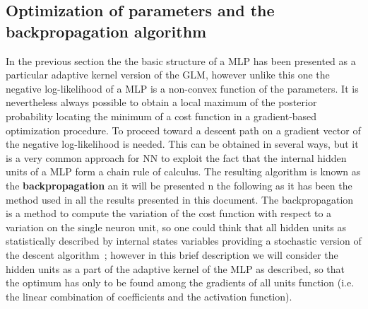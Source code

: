 

\subsection{Optimization of parameters and the backpropagation algorithm}

In the previous section the the basic structure of a \acl{MLP} has been presented as a particular adaptive kernel version of the \acl{GLM}, however unlike this one the negative log-likelihood of a \acl{MLP} is a non-convex function of the parameters. It is nevertheless always possible to obtain a local maximum of the posterior probability locating the minimum of a cost function in a gradient-based optimization procedure. 
To proceed toward a descent path on a gradient vector of the negative log-likelihood is needed. This can be obtained in several ways, but it is a very common approach for NN to exploit the fact that the internal hidden units of a \acl{MLP} form a chain rule of calculus. The resulting algorithm is known as the \textbf{backpropagation} an it will be presented n the following as it has been the method used in all the results presented in this document. The backpropagation is a method to compute the variation of the cost function with respect to a variation on the single neuron unit, so one could think that all hidden units as statistically described by internal states variables providing a stochastic version of the descent algorithm~\cite{rezende2014stochastic}; however in this brief description we will consider the hidden units as a part of the adaptive kernel of the \acl{MLP} as described, so that the optimum has only to be found among the gradients of all units function (i.e. the linear combination of coefficients and the activation function). 

